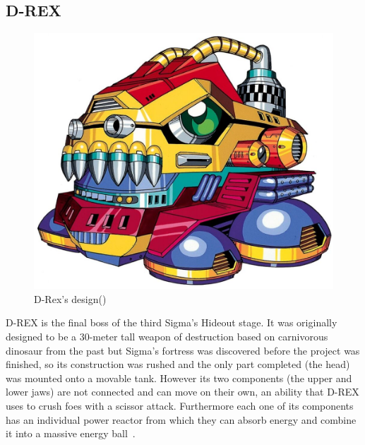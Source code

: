 \subsection{D-REX}
\begin{figure}[htp]
	\centering
	\includegraphics[width=0.4\linewidth]{figures/X1/Sigma_stages/Drex.jpg}
	\caption{D-Rex's design(\cite{book:MMX_Complete_art})}
\end{figure}

D-REX is the final boss of the third Sigma's Hideout stage. It was originally designed to be a 30-meter tall weapon of destruction based on carnivorous dinosaur from the past but Sigma's fortress was discovered before the project was finished, so its construction was rushed and the only part completed (the head) was mounted onto a movable tank. However its two components (the upper and lower jaws) are not connected and can move on their own, an ability that D-REX uses to crush foes with a scissor attack. Furthermore each one of its components has an individual power reactor from which they can absorb energy and combine it into a massive energy ball~\cite{wayback:X_resources}.

